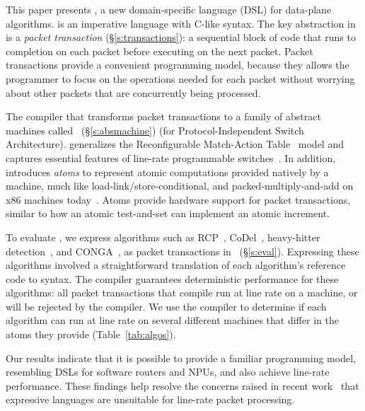 This paper presents \pktlanguage, a new domain-specific language (DSL)
for data-plane algorithms.  \pktlanguage is an imperative language
with C-like syntax. The key abstraction in \pktlanguage is a {\em
  packet transaction} (\S\ref{s:transactions}): a sequential block of
code that runs to completion on each packet before executing on the
next packet. Packet transactions provide a convenient programming
model, because they allows the programmer to focus on the operations
needed for each packet without worrying about other packets that are
concurrently being processed.


The \pktlanguage compiler that transforms packet transactions to a
family of abstract machines called \absmachine~(\S\ref{s:absmachine})
(for Protocol-Independent Switch Architecture). \absmachine
generalizes the Reconfigurable Match-Action Table~\cite{rmt} model and
captures essential features of line-rate programmable
switches~\cite{rmt, xpliant, flexpipe}. In addition, \absmachine
introduces {\em atoms} to represent atomic computations provided
natively by a \absmachine machine, much like
load-link/store-conditional, and packed-multiply-and-add on x86
machines today~\cite{x86_manual}.  Atoms provide hardware support for
packet transactions, similar to how an atomic test-and-set can
implement an atomic increment.

To evaluate \pktlanguage, we express algorithms such as
RCP~\cite{rcp}, CoDel~\cite{codel}, heavy-hitter
detection~\cite{opensketch}, and CONGA~\cite{conga}, as packet
transactions in \pktlanguage~(\S\ref{s:eval}). Expressing these
algorithms involved a straightforward translation of each algorithm's
reference code to \pktlanguage syntax.  The \pktlanguage compiler
guarantees deterministic performance for these algorithms: all packet
transactions that compile run at line rate on a \absmachine machine,
or will be rejected by the compiler.  We use the \pktlanguage compiler
to determine if each algorithm can run at line rate on several
different \absmachine machines that differ in the atoms they provide
(Table~\ref{tab:algos}).

Our results indicate that it is possible to provide a familiar
programming model, resembling DSLs for software routers and NPUs, and
also achieve line-rate performance. These findings help resolve the
concerns raised in recent work~\cite{p4} that expressive languages are
unsuitable for line-rate packet processing.


